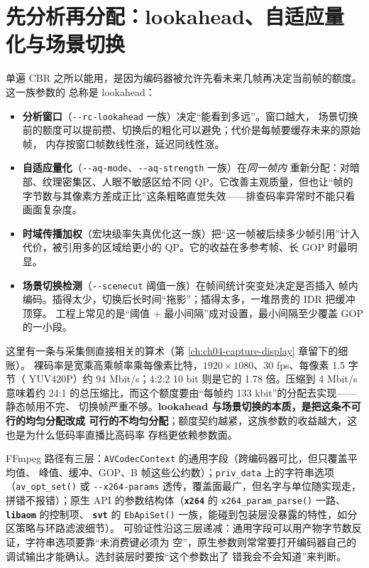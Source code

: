 \documentclass[12pt,a4paper,fontset=fandol]{ctexbook}
\newcommand{\Fn}[1]{\texttt{#1()}}
\newcommand{\Tp}[1]{\texttt{#1}}
\newcommand{\Opt}[1]{\texttt{-\/-#1}}
\newcommand{\Lib}[1]{\textbf{\texttt{#1}}}
\begin{document}
\section{先分析再分配：lookahead、自适应量化与场景切换}

单遍 CBR 之所以能用，是因为编码器被允许先看未来几帧再决定当前帧的额度。这一族参数的
总称是 lookahead：

\begin{itemize}
\item \textbf{分析窗口}（\Opt{rc-lookahead} 一族）决定``能看到多远''。窗口越大，
  场景切换前的额度可以提前攒、切换后的粗化可以避免；代价是每帧要缓存未来的原始帧，
  内存按窗口帧数线性涨，延迟同线性涨。
\item \textbf{自适应量化}（\Opt{aq-mode}、\Opt{aq-strength} 一族）在\emph{同一帧内}
  重新分配：对暗部、纹理密集区、人眼不敏感区给不同 QP。它改善主观质量，但也让``帧的
  字节数与其像素方差成正比''这条粗略直觉失效——排查码率异常时不能只看画面复杂度。
\item \textbf{时域传播加权}（宏块级率失真优化这一族）把``这一帧被后续多少帧引用''计入
  代价，被引用多的区域给更小的 QP。它的收益在多参考帧、长 GOP 时最明显。
\item \textbf{场景切换检测}（\Opt{scenecut} 阈值一族）在帧间统计突变处决定是否插入
  帧内编码。插得太少，切换后长时间``拖影''；插得太多，一堆昂贵的 IDR 把缓冲顶穿。
  工程上常见的是``阈值 + 最小间隔''成对设置，最小间隔至少覆盖 GOP 的一小段。
\end{itemize}

这里有一条与采集侧直接相关的算术（第 \ref{ch:ch04-capture-display} 章留下的细账）。
裸码率是宽乘高乘帧率乘每像素比特，$1920 \times 1080$、30 fps、每像素 1.5 字节（
YUV420P）约 94 Mbit/s；4:2:2 10 bit 则是它的 1.78 倍。压缩到 4 Mbit/s 意味着约
24:1 的总压缩比，而这个额度要由``每帧约 133 kbit''的分配去实现——静态帧用不完、
切换帧严重不够。\textbf{lookahead 与场景切换的本质，是把这条不可行的均匀分配改成
可行的不均匀分配}；额度契约越紧，这族参数的收益越大，这也是为什么低码率直播比高码率
存档更依赖参数面。

\begin{compare}[title={参数在哪一层被暴露，决定了它能不能被验证}]
FFmpeg 路径有三层：\Tp{AVCodecContext} 的通用字段（跨编码器可比，但只覆盖平均值、
峰值、缓冲、GOP、B 帧这些公约数）；\Tp{priv\_data} 上的字符串选项（\Fn{av\_opt\_set}
或 \Opt{x264-params} 透传，覆盖面最广，但名字与单位随实现走，拼错不报错）；原生 API
的参数结构体（\Lib{x264} 的 \Fn{x264\_param\_parse} 一路、\Lib{libaom} 的控制项、
\Lib{svt} 的 \Fn{EbApiSet} 一族，能碰到包装层没暴露的特性，如分区策略与环路滤波细节）。
可验证性沿这三层递减：通用字段可以用产物字节数反证，字符串选项要靠``未消费键必须为
空''，原生参数则常常要打开编码器自己的调试输出才能确认。选封装层时要按``这个参数出了
错我会不会知道''来判断。
\end{compare}
\end{document}
